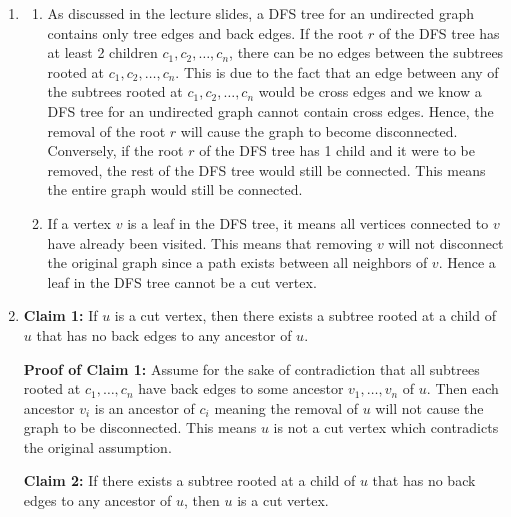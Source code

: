 \documentclass[11pt, letterpaper, titlepage]{article}
\begin{document}
\begin{enumerate}[label=\alph*.]
\begin{figure}[H]
    \end{figure}

    \item \begin{enumerate}[label=\roman*)]
        \item As discussed in the lecture slides, a DFS tree for an undirected graph contains only tree edges and back edges. If the root $r$ of the DFS tree has at least 2 children $c_1, c_2, \ldots, c_n$, there can be no edges between the subtrees rooted at $c_1, c_2, \ldots, c_n$. This is due to the fact that an edge between any of the subtrees rooted at $c_1, c_2, \ldots, c_n$ would be cross edges and we know a DFS tree for an undirected graph cannot contain cross edges. Hence, the removal of the root $r$ will cause the graph to become disconnected. Conversely, if the root $r$ of the DFS tree has 1 child and it were to be removed, the rest of the DFS tree would still be connected. This means the entire graph would still be connected.
        
        \item If a vertex $v$ is a leaf in the DFS tree, it means all vertices connected to $v$ have already been visited. This means that removing $v$ will not disconnect the original graph since a path exists between all neighbors of $v$. Hence a leaf in the DFS tree cannot be a cut vertex.
    \end{enumerate}

    \item \textbf{Claim 1:} If $u$ is a cut vertex, then there exists a subtree rooted at a child of $u$ that has no back edges to any ancestor of $u$.
    
    \textbf{Proof of Claim 1:} Assume for the sake of contradiction that all subtrees rooted at $c_1, \ldots, c_n$ have back edges to some ancestor $v_1, \ldots, v_n$ of $u$. Then each ancestor $v_i$ is an ancestor of $c_i$ meaning the removal of $u$ will not cause the graph to be disconnected. This means $u$ is not a cut vertex which contradicts the original assumption.

    \textbf{Claim 2:} If there exists a subtree rooted at a child of $u$ that has no back edges to any ancestor of $u$, then $u$ is a cut vertex.
    

\end{enumerate}
\end{document}
